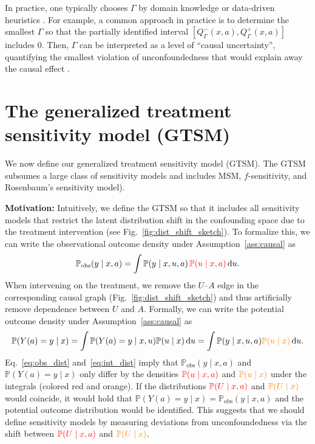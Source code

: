 \documentclass{article} %
\newcommand*\diff{\mathop{}\!\mathrm{d}}
\theoremstyle{definition}
\theoremstyle{plain}
\begin{document}
In practice, one typically chooses $\Gamma$ by domain knowledge or data-driven heuristics \citep{Kallus.2019, Hatt.2022b}. For example, a common approach in practice is to determine the smallest $\Gamma$ so that the partially identified interval $[Q^-_\Gamma(x, a), Q^+_\Gamma(x, a)]$ includes $0$. Then, $\Gamma$ can be interpreted as a level of ``causal uncertainty'', quantifying the smallest violation of unconfoundedness that would explain away the causal effect \citep{Jesson.2021, Jin.2023}.



\section{The generalized treatment sensitivity model (GTSM)}\label{sec:general_sensitivity}

We now define our generalized treatment sensitivity model (GTSM). The GTSM subsumes a large class of sensitivity models and includes MSM, $f$-sensitivity, and Rosenbaum's sensitivity model).

\textbf{Motivation:} Intuitively, we define the GTSM so that it includes all sensitivity models that restrict the latent distribution shift in the confounding space due to the treatment intervention (see Fig.~\ref{fig:dist_shift_sketch}). To formalize this, we can write the observational outcome density under Assumption~\ref{ass:causal} as
\begin{equation}\label{eq:obs_dist}
    \mathbb{P}_\mathrm{obs}(y \mid x, a) = \int \mathbb{P}(y \mid x, u, a) \color{red} \, \mathbb{P}(u \mid x, a) \color{black} \diff u.
\end{equation}
When intervening on the treatment, we remove the $U$--$A$ edge in the corresponding causal graph (Fig.~\ref{fig:dist_shift_sketch}) and thus artificially remove dependence between $U$ and $A$. Formally, we can write the potential outcome density under Assumption~\ref{ass:causal} as
\begin{equation}\label{eq:int_dist}
    \mathbb{P}(Y(a) = y \mid x) = \int \mathbb{P}(Y(a) = y \mid x, u) \mathbb{P}(u \mid x) \diff u = \int \mathbb{P}(y \mid x, u, a) \color{orange} \mathbb{P}(u \mid x) \color{black} \diff u.
\end{equation}
Eq.~\eqref{eq:obs_dist} and~\eqref{eq:int_dist} imply that $\mathbb{P}_\mathrm{obs}(y \mid x, a)$ and $\mathbb{P}(Y(a) = y \mid x)$ only differ by the densities $\color{red} \mathbb{P}(u \mid x, a)$ and $\color{orange} \mathbb{P}(u \mid x)$ under the integrals (colored red and orange). If the distributions $\color{red}\mathbb{P}(U \mid x, a)$ and $\color{orange}\mathbb{P}(U \mid x)$ would coincide, it would hold that $\mathbb{P}(Y(a) = y \mid x) = \mathbb{P}_\mathrm{obs}(y \mid x, a)$ and the potential outcome distribution would be identified. This suggests that we should define sensitivity models by measuring deviations from unconfoundedness via the shift between  $\color{red}\mathbb{P}(U \mid x, a)$ and $\color{orange}\mathbb{P}(U \mid x)$.
\end{document}
